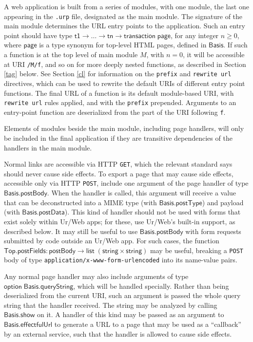 \documentclass{article}
\newcommand{\mt}[1]{\mathsf{#1}}
\begin{document}
A web application is built from a series of modules, with one module, the last one appearing in the \texttt{.urp} file, designated as the main module.  The signature of the main module determines the URL entry points to the application.  Such an entry point should have type $\mt{t1} \to \ldots \to \mt{tn} \to \mt{transaction} \; \mt{page}$, for any integer $n \geq 0$, where $\mt{page}$ is a type synonym for top-level HTML pages, defined in $\mt{Basis}$.  If such a function is at the top level of main module $M$, with $n = 0$, it will be accessible at URI \texttt{/M/f}, and so on for more deeply nested functions, as described in Section \ref{tag} below.  See Section \ref{cl} for information on the \texttt{prefix} and \texttt{rewrite url} directives, which can be used to rewrite the default URIs of different entry point functions.  The final URL of a function is its default module-based URI, with \texttt{rewrite url} rules applied, and with the \texttt{prefix} prepended.  Arguments to an entry-point function are deserialized from the part of the URI following \texttt{f}.

Elements of modules beside the main module, including page handlers, will only be included in the final application if they are transitive dependencies of the handlers in the main module.

Normal links are accessible via HTTP \texttt{GET}, which the relevant standard says should never cause side effects.  To export a page that may cause side effects, accessible only via HTTP \texttt{POST}, include one argument of the page handler of type $\mt{Basis.postBody}$.  When the handler is called, this argument will receive a value that can be deconstructed into a MIME type (with $\mt{Basis.postType}$) and payload (with $\mt{Basis.postData}$).  This kind of handler should not be used with forms that exist solely within Ur/Web apps; for these, use Ur/Web's built-in support, as described below.  It may still be useful to use $\mt{Basis.postBody}$ with form requests submitted by code outside an Ur/Web app.  For such cases, the function $\mt{Top.postFields} : \mt{postBody} \to \mt{list} \; (\mt{string} \times \mt{string})$ may be useful, breaking a \texttt{POST} body of type \texttt{application/x-www-form-urlencoded} into its name-value pairs.

Any normal page handler may also include arguments of type $\mt{option \; Basis.queryString}$, which will be handled specially.  Rather than being deserialized from the current URI, such an argument is passed the whole query string that the handler received.  The string may be analyzed by calling $\mt{Basis.show}$ on it.  A handler of this kind may be passed as an argument to $\mt{Basis.effectfulUrl}$ to generate a URL to a page that may be used as a ``callback'' by an external service, such that the handler is allowed to cause side effects.
\end{document}
